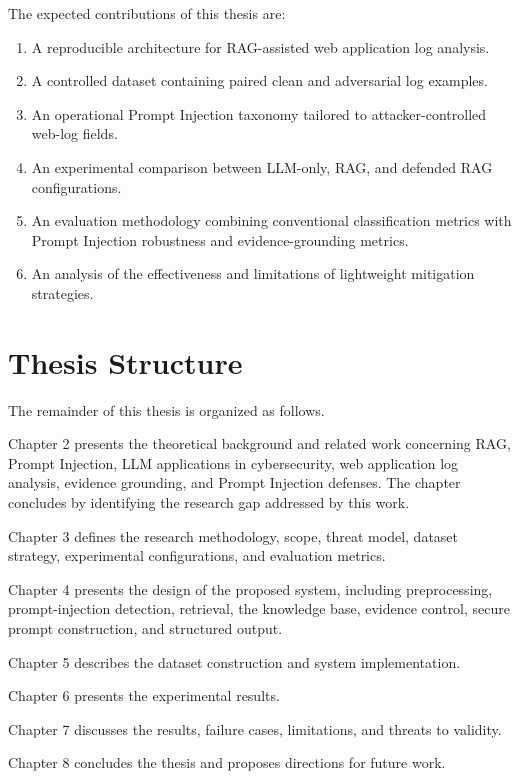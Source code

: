The expected contributions of this thesis are:

\begin{enumerate}
\def\labelenumi{\arabic{enumi}.}
\tightlist
\item
  A reproducible architecture for RAG-assisted web application log
  analysis.
\item
  A controlled dataset containing paired clean and adversarial log
  examples.
\item
  An operational Prompt Injection taxonomy tailored to
  attacker-controlled web-log fields.
\item
  An experimental comparison between LLM-only, RAG, and defended RAG
  configurations.
\item
  An evaluation methodology combining conventional classification
  metrics with Prompt Injection robustness and evidence-grounding
  metrics.
\item
  An analysis of the effectiveness and limitations of lightweight
  mitigation strategies.
\end{enumerate}

\section{Thesis Structure}\label{thesis-structure}

The remainder of this thesis is organized as follows.

Chapter 2 presents the theoretical background and related work
concerning RAG, Prompt Injection, LLM applications in cybersecurity, web
application log analysis, evidence grounding, and Prompt Injection
defenses. The chapter concludes by identifying the research gap
addressed by this work.

Chapter 3 defines the research methodology, scope, threat model, dataset
strategy, experimental configurations, and evaluation metrics.

Chapter 4 presents the design of the proposed system, including
preprocessing, prompt-injection detection, retrieval, the knowledge
base, evidence control, secure prompt construction, and structured
output.

Chapter 5 describes the dataset construction and system implementation.

Chapter 6 presents the experimental results.

Chapter 7 discusses the results, failure cases, limitations, and threats
to validity.

Chapter 8 concludes the thesis and proposes directions for future work.
